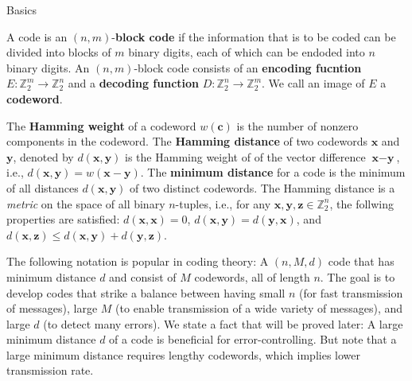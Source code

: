 \documentclass[final]{beamer}
\newcommand{\Z}{\mathbb{Z}}
\newlength{\colwidth}
\begin{document}
\begin{frame}[t]
\begin{columns}[t]
\begin{column}{\colwidth}
  \vspace{-16mm}

  \begin{block}{Basics}

    A code is an $(n,m)$-\textbf{block code} if the information that is to be coded can be divided into blocks of $m$ binary digits, each of which can be endoded into $n$ binary digits. An $(n, m)$-block code consists of an \textbf{encoding fucntion} $E: \Z_{2}^m \to \Z_{2}^n$ and a \textbf{decoding function} $D: \Z_{2}^n \to \Z_{2}^m$. We call an image of $E$ a \textbf{codeword}. 
    
    The \textbf{Hamming weight} of a codeword $w(\textbf{c})$ is the number of nonzero components in the codeword. The \textbf{Hamming distance} of two codewords $\textbf{x}$ and $\textbf{y}$, denoted by $d(\textbf{x},\textbf{y})$ is the Hamming weight of of the vector difference $\textbf{x} - \textbf{y}$, i.e., $d(\textbf{x},\textbf{y}) = w(\textbf{x} - \textbf{y})$. The \textbf{minimum distance} for a code is the minimum of all distances $d(\textbf{x},\textbf{y})$ of two distinct codewords. 
    The Hamming distance is a \textit{metric} on the space of all binary $n$-tuples, i.e.,
    for any $\textbf{x}, \textbf{y}, \textbf{z} \in \Z_2^n$, the follwing properties are satisfied:
      $d(\textbf{x}, \textbf{x}) = 0$,
      $d(\textbf{x},\textbf{y}) = d(\textbf{y}, \textbf{x})$,
      and $d(\textbf{x},\textbf{z}) \leq d(\textbf{x},\textbf{y}) + d(\textbf{y},\textbf{z})$.

    The following notation is popular in coding theory: 
    A $(n, M, d)$ code that has minimum distance $d$ and consist 
    of $M$ codewords, all of length $n$. The goal is to develop codes that strike
    a balance between having small $n$ (for fast transmission of messages), large $M$
    (to enable transmission of a wide variety of messages), and large $d$ (to detect
    many errors). We state a fact that will be proved later: A large minimum distance $d$ of a code is beneficial for error-controlling.
    But note that a large minimum distance requires lengthy codewords, which implies lower transmission rate. 
  
  \vspace{2mm}

  \end{block}



\end{column}
\end{columns}
\end{frame}
\end{document}
